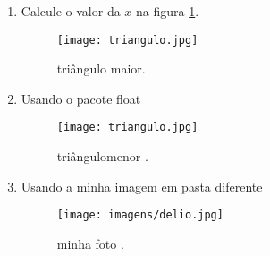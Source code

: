 \documentclass[a4paper,12pt]{article}
\begin{document}
   \begin{enumerate}
      \item Calcule o valor da $x$ na figura \ref{triangulo}.%
      \begin{figure}[!htb]
         \texttt{[image: triangulo.jpg]}
         \caption{triângulo maior.}
         \label{triangulo}
      \end{figure}
      \item Usando o pacote float\\
      \begin{figure}[H]
         \centering %
         \texttt{[image: triangulo.jpg]}
         \caption{triângulomenor .} %
         \label{triangulo menor}
      \end{figure}
       \item Usando a minha imagem em pasta diferente\\
      \begin{figure}[H]
         \centering %
         \texttt{[image: imagens/delio.jpg]}
         \caption{minha foto .} %
         \label{triangulo menor}
      \end{figure}
   \end{enumerate}      
   
\end{document}
